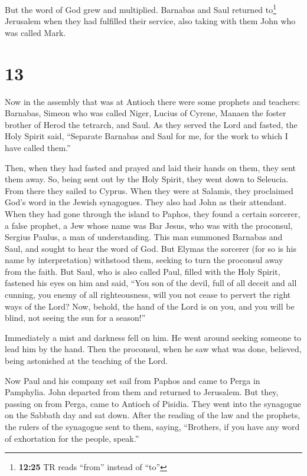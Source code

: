  But the word of God grew and multiplied. 
Barnabas and Saul returned to\footnote{\textbf{12:25} TR reads ``from''
  instead of ``to''} Jerusalem when they had fulfilled their service,
also taking with them John who was called Mark.

\hypertarget{section-12}{%
\section{13}\label{section-12}}

 Now in the assembly that was at Antioch there were some
prophets and teachers: Barnabas, Simeon who was called Niger, Lucius of
Cyrene, Manaen the foster brother of Herod the tetrarch, and Saul.
 As they served the Lord and fasted, the Holy Spirit said,
``Separate Barnabas and Saul for me, for the work to which I have called
them.''

 Then, when they had fasted and prayed and laid their
hands on them, they sent them away.  So, being sent out by
the Holy Spirit, they went down to Seleucia. From there they sailed to
Cyprus.  When they were at Salamis, they proclaimed God's
word in the Jewish synagogues. They also had John as their attendant.
 When they had gone through the island to Paphos, they
found a certain sorcerer, a false prophet, a Jew whose name was Bar
Jesus,  who was with the proconsul, Sergius Paulus, a man
of understanding. This man summoned Barnabas and Saul, and sought to
hear the word of God.  But Elymas the sorcerer (for so is
his name by interpretation) withstood them, seeking to turn the
proconsul away from the faith.  But Saul, who is also
called Paul, filled with the Holy Spirit, fastened his eyes on him
 and said, ``You son of the devil, full of all deceit and
all cunning, you enemy of all righteousness, will you not cease to
pervert the right ways of the Lord?  Now, behold, the
hand of the Lord is on you, and you will be blind, not seeing the sun
for a season!''

Immediately a mist and darkness fell on him. He went around seeking
someone to lead him by the hand.  Then the proconsul,
when he saw what was done, believed, being astonished at the teaching of
the Lord.

 Now Paul and his company set sail from Paphos and came
to Perga in Pamphylia. John departed from them and returned to
Jerusalem.  But they, passing on from Perga, came to
Antioch of Pisidia. They went into the synagogue on the Sabbath day and
sat down.  After the reading of the law and the prophets,
the rulers of the synagogue sent to them, saying, ``Brothers, if you
have any word of exhortation for the people, speak.''

